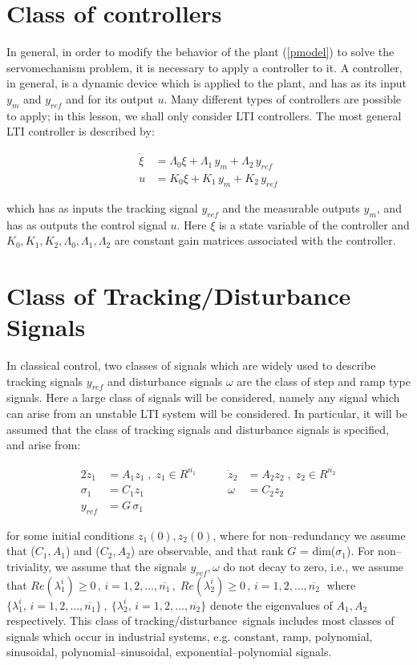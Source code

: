 \documentclass[a4paper]{article}
\theoremstyle{plain} %
{\theorembodyfont{\normalfont}
\newtheorem{Exa}{Example}}
\def\td{tracking/disturbance}
\begin{document}
\section{Class of controllers}
In general, in order to modify the behavior of the plant
(\ref{pmodel}) to solve the servomechanism problem, it is
necessary to apply a controller to it. A controller, in general,
is a dynamic device which is applied to the plant, and has as its
input $y_m$ and $y_{ref}$ and for its output $u$. Many different
types of controllers are possible to apply; in this lesson, we
shall only consider LTI controllers. The most general LTI
controller is described by:

\begin{align}\label{class-ctr}
 \dot{\xi} &= {\Lambda}_{0}\xi + {\Lambda}_1 \, y_m + {\Lambda}_2
 \, y_{ref} \\
 u &= K_0 \xi + K_1 \, y_m + K_2 \, y_{ref} \nonumber
\end{align}

which has as inputs the tracking signal $y_{ref}$ and the
measurable outputs $y_m$, and has as outputs the control signal
$u$. Here $\xi$ is a state variable of the controller and
$K_0,K_1,K_2,\Lambda_0,\Lambda_1,\Lambda_2$ are constant gain
matrices associated with the controller.

\section{Class of Tracking/Disturbance Signals}
In classical control, two classes of signals which are widely used
to describe tracking signals $y_{ref}$ and disturbance signals
$\omega$ are the class of step and ramp type signals. Here a large
class of signals will be considered, namely any signal which can
arise from an unstable LTI system will be considered. In
particular, it will be assumed that the class of tracking signals
and disturbance signals is specified, and arise from:

\begin{alignat}{2}\label{class-tds}
\dot{z}_1 &= A_1 z_1 \;,\; z_1 \in R^{\overline{n_1}} &\qquad %
\dot{z}_2 &= A_2 z_2 \;,\; z_2 \in R^{\overline{n_2}} \nonumber \\%
\sigma_1 &= C_1 z_1  &\qquad
\omega &= C_2 z_2 \\%
y_{ref} &= G \, \sigma_1 \nonumber %
\end{alignat}

for some initial conditions $z_1(0), z_2(0)$, where for
non--redundancy we assume that ($C_1, A_1$) and ($C_2, A_2$) are
observable, and that rank $G$ = dim($\sigma_1$). For
non--triviality, we assume that the signals $y_{ref}, \omega$ do
not decay to zero, i.e., we assume that $Re(\lambda_{1}^i)\geq 0 \,
, \,i=1,2,\ldots,\overline{n_1} \, , \; Re(\lambda_{2}^i)\geq 0 \,
, \, i=1,2,\ldots,\overline{n_2} \;$ where $\{ \lambda_{1}^i,\,
i=1,2,\ldots, \overline{n_1} \} \:,\: \{ \lambda_{2}^i,
\,i=1,2,\ldots, \overline{n_2} \}$ denote the eigenvalues of $A_1,
A_2$ respectively. This class of \td\ signals includes most classes
of signals which occur in industrial systems, e.g. constant, ramp,
polynomial, sinusoidal, polynomial--sinusoidal,
exponential--polynomial signals.\\
\end{document}
